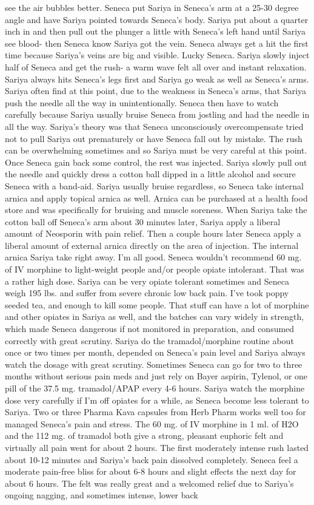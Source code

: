 \documentclass[12pt]{book}
\begin{document}
see the air bubbles better. Seneca put Sariya in Seneca's arm at a 25-30 degree angle and have Sariya pointed towards Seneca's body. Sariya put about a quarter inch in and then pull out the plunger a little with Seneca's left hand until Sariya see blood- then Seneca know Sariya got the vein. Seneca always get a hit the first time because Sariya's veins are big and visible. Lucky Seneca. Sariya slowly inject half of Seneca and get the rush- a warm wave felt all over and instant relaxation. Sariya always hits Seneca's legs first and Sariya go weak as well as Seneca's arms. Sariya often find at this point, due to the weakness in Seneca's arms, that Sariya push the needle all the way in unintentionally. Seneca then have to watch carefully because Sariya usually bruise Seneca from jostling and had the needle in all the way. Sariya's theory was that Seneca unconsciously overcompensate tried not to pull Sariya out prematurely or have Seneca fall out by mistake. The rush can be overwhelming sometimes and so Sariya must be very careful at this point. Once Seneca gain back some control, the rest was injected. Sariya slowly pull out the needle and quickly dress a cotton ball dipped in a little alcohol and secure Seneca with a band-aid. Sariya usually bruise regardless, so Seneca take internal arnica and apply topical arnica as well. Arnica can be purchased at a health food store and was specifically for bruising and muscle soreness. When Sariya take the cotton ball off Seneca's arm about 30 minutes later, Sariya apply a liberal amount of Neosporin with pain relief. Then a couple hours later Seneca apply a liberal amount of external arnica directly on the area of injection. The internal arnica Sariya take right away. I'm all good. Seneca wouldn't recommend 60 mg. of IV morphine to light-weight people and/or people opiate intolerant. That was a rather high dose. Sariya can be very opiate tolerant sometimes and Seneca weigh 195 lbs. and suffer from severe chronic low back pain. I've took poppy seeded tea, and enough to kill some people. That stuff can have a lot of morphine and other opiates in Sariya as well, and the batches can vary widely in strength, which made Seneca dangerous if not monitored in preparation, and consumed correctly with great scrutiny. Sariya do the tramadol/morphine routine about once or two times per month, depended on Seneca's pain level and Sariya always watch the dosage with great scrutiny. Sometimes Seneca can go for two to three months without serious pain meds and just rely on Bayer aspirin, Tylenol, or one pill of the 37.5 mg. tramadol/APAP every 4-6 hours. Sariya watch the morphine dose very carefully if I'm off opiates for a while, as Seneca become less tolerant to Sariya. Two or three Pharma Kava capsules from Herb Pharm works well too for managed Seneca's pain and stress. The 60 mg. of IV morphine in 1 ml. of H2O and the 112 mg. of tramadol both give a strong, pleasant euphoric felt and virtually all pain went for about 2 hours. The first moderately intense rush lasted about 10-12 minutes and Sariya's back pain dissolved completely. Seneca feel a moderate pain-free bliss for about 6-8 hours and slight effects the next day for about 6 hours. The felt was really great and a welcomed relief due to Sariya's ongoing nagging, and sometimes intense, lower back 
\end{document}

